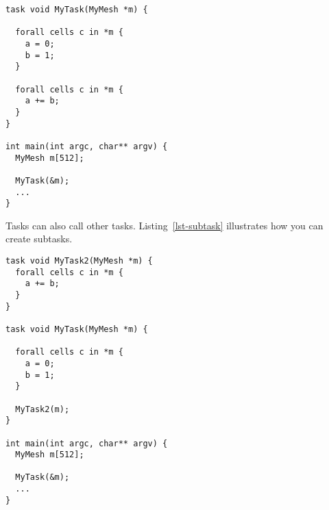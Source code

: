 \par\bigskip
\begin{lstlisting}[float=h,label=lst-task,
	caption={Specifying tasks using \texttt{task} construct.}]
task void MyTask(MyMesh *m) {
  
  forall cells c in *m {
    a = 0;
    b = 1;
  }

  forall cells c in *m {
    a += b;
  }
}

int main(int argc, char** argv) {
  MyMesh m[512];

  MyTask(&m);
  ...
}
\end{lstlisting}
\par\bigskip\noindent

Tasks can also call other tasks.  
Listing~\ref{lst-subtask} illustrates how you can create subtasks. 

\par\bigskip
\begin{lstlisting}[float=h,label=lst-subtask,
	caption={Specifying subtasks.}]
task void MyTask2(MyMesh *m) {
  forall cells c in *m {
    a += b;
  }
}

task void MyTask(MyMesh *m) {
  
  forall cells c in *m {
    a = 0;
    b = 1;
  }

  MyTask2(m);
}

int main(int argc, char** argv) {
  MyMesh m[512];

  MyTask(&m);
  ...
}

\end{lstlisting}
\par\bigskip\noindent


